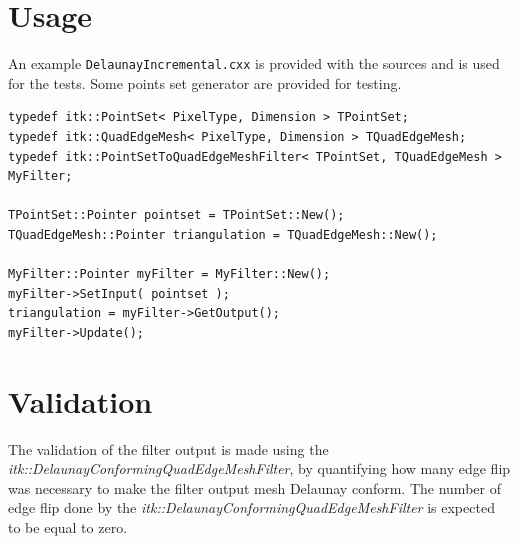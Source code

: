 \documentclass{InsightArticle}
\begin{document}
\begin{figure}
\label{fig:Algo}
\end{figure}

\section{Usage}

An example \texttt{DelaunayIncremental.cxx} is provided with the sources and is used for the tests. Some points set generator are provided for testing.

\begin{verbatim}
typedef itk::PointSet< PixelType, Dimension > TPointSet;
typedef itk::QuadEdgeMesh< PixelType, Dimension > TQuadEdgeMesh;
typedef itk::PointSetToQuadEdgeMeshFilter< TPointSet, TQuadEdgeMesh > MyFilter;

TPointSet::Pointer pointset = TPointSet::New();
TQuadEdgeMesh::Pointer triangulation = TQuadEdgeMesh::New();

MyFilter::Pointer myFilter = MyFilter::New();
myFilter->SetInput( pointset );
triangulation = myFilter->GetOutput();
myFilter->Update();
\end{verbatim}

\section{Validation}

The validation of the filter output is made using the \emph{itk::DelaunayConformingQuadEdgeMeshFilter}, by quantifying how many edge flip was necessary to make the filter output mesh Delaunay conform. The number of edge flip done by the \emph{itk::DelaunayConformingQuadEdgeMeshFilter} is expected to be equal to zero.
\end{document}

